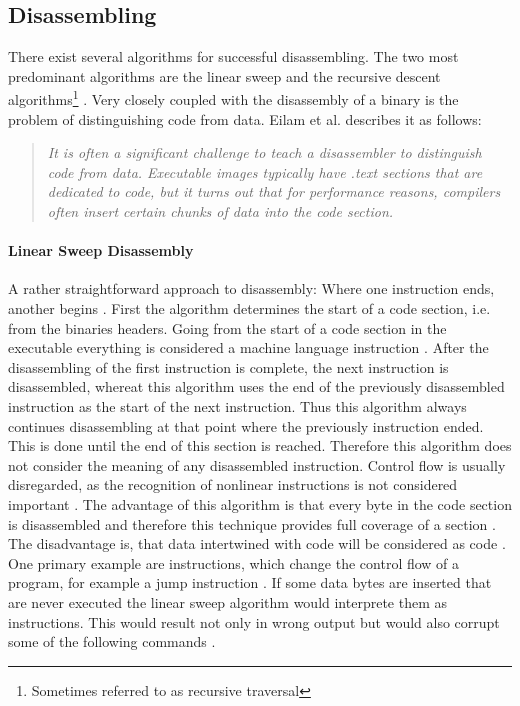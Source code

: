 \documentclass[10pt,twoside,a4paper,bibliography=totoc]{scrbook}
\begin{document}
\subsection{Disassembling}
\label{sec2:disassm}
There exist several algorithms for successful disassembling.
The two most predominant algorithms are the linear sweep and the recursive descent algorithms\footnote{Sometimes referred to as recursive traversal} \cite{idabook}.
Very closely coupled with the disassembly of a binary is the problem of distinguishing code from data. Eilam et al. describes it as follows:
\begin{quote}
\emph{It is often a significant challenge to teach a disassembler to distinguish code from data. Executable images typically have .text sections that are dedicated to code, but it turns out that for performance reasons, compilers often insert certain chunks of data into the code section.}
\end{quote}



\paragraph*{Linear Sweep Disassembly}
A rather straightforward approach to disassembly: Where one instruction ends, another begins \cite{idabook}.
First the algorithm determines the start of a code section, i.e. from the binaries headers.
Going from the start of a code section in the executable everything is considered a machine language instruction \cite{idabook}. 
After the disassembling of the first instruction is complete, the next instruction is disassembled, whereat this algorithm uses the end of the previously disassembled instruction as the start of the next instruction.
Thus this algorithm always continues disassembling at that point where the previously instruction ended.
This is done until the end of this section is reached. 
Therefore this algorithm does not consider the meaning of any disassembled instruction.
Control flow is usually disregarded, as the recognition of nonlinear instructions is not considered important \cite{idabook}. 
The advantage of this algorithm is that every byte in the code section is disassembled and therefore this technique provides full coverage of a section \cite{idabook}.
The disadvantage is, that data intertwined with code will be considered as code \cite{eilam}.
One primary example are instructions, which change the control flow of a program, for example a jump instruction \cite{eilam}. If some data bytes are inserted that are never executed the linear sweep algorithm would interprete them as instructions. This would result not only in wrong output but would also corrupt some of the following commands \cite{eilam}.
\end{document}
